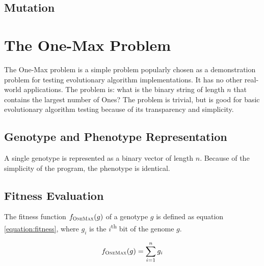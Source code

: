 \documentclass{article}
\begin{document}
\subsection{Mutation}

\section{The One-Max Problem}

The One-Max problem is a simple problem popularly chosen as a demonstration problem for testing evolutionary algorithm implementations.
It has no other real-world applications.
The problem is: what is the binary string of length $ n $ that contains the largest number of Ones?
The problem is trivial, but is good for basic evolutionary algorithm testing because of its transparency and simplicity.

\subsection{Genotype and Phenotype Representation}

A single genotype is represented as a binary vector of length $ n $.
Because of the simplicity of the program, the phenotype is identical.

\subsection{Fitness Evaluation}

The fitness function $ f_{\textsc{OneMax}}(g) $ of a genotype $ g $ is defined as equation \ref{equation:fitness}, where $ g_i $ is the $ i $\textsuperscript{th} bit of the genome $ g $.

\begin{equation}\label{equation:fitness}
f_{\textsc{OneMax}}(g) = \sum_{i=1}^{n} g_i
\end{equation}
\end{document}
